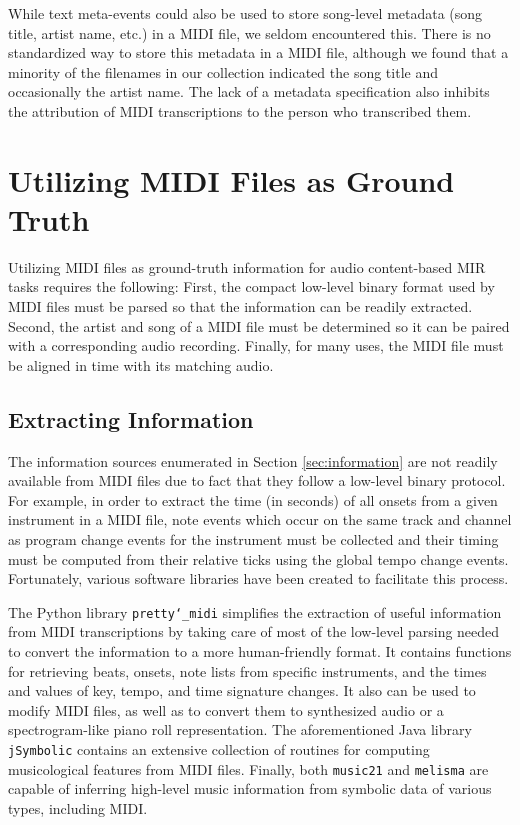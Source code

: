 \documentclass{article}
\begin{document}
While text meta-events could also be used to store song-level metadata (song title, artist name, etc.) in a MIDI file, we seldom encountered this.
There is no standardized way to store this metadata in a MIDI file, although we found that a minority of the filenames in our collection indicated the song title and occasionally the artist name.
The lack of a metadata specification also inhibits the attribution of MIDI transcriptions to the person who transcribed them.

\section{Utilizing MIDI Files as Ground Truth}
\label{sec:utilizing}

Utilizing MIDI files as ground-truth information for audio content-based MIR tasks requires the following:
First, the compact low-level binary format used by MIDI files must be parsed so that the information can be readily extracted.
Second, the artist and song of a MIDI file must be determined so it can be paired with a corresponding audio recording.
Finally, for many uses, the MIDI file must be aligned in time with its matching audio.

\subsection{Extracting Information}

The information sources enumerated in Section \ref{sec:information} are not readily available from MIDI files due to fact that they follow a low-level binary protocol.
For example, in order to extract the time (in seconds) of all onsets from a given instrument in a MIDI file, note events which occur on the same track and channel as program change events for the instrument must be collected and their timing must be computed from their relative ticks using the global tempo change events.
Fortunately, various software libraries have been created to facilitate this process.

The Python library \texttt{pretty\char`_midi} \cite{raffel2014pretty_midi} simplifies the extraction of useful information from MIDI transcriptions by taking care of most of the low-level parsing needed to convert the information to a more human-friendly format.
It contains functions for retrieving beats, onsets, note lists from specific instruments, and the times and values of key, tempo, and time signature changes.
It also can be used to modify MIDI files, as well as to convert them to synthesized audio or a spectrogram-like piano roll representation.
The aforementioned Java library \texttt{jSymbolic} contains an extensive collection of routines for computing musicological features from MIDI files.
Finally, both \texttt{music21} and \texttt{melisma} are capable of inferring high-level music information from symbolic data of various types, including MIDI.
\end{document}
